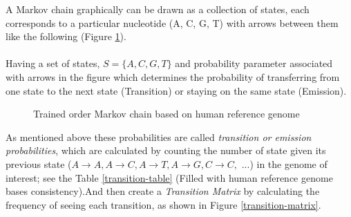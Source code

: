 \documentclass[11pt,a4paper]{report}
\begin{document}
 
A Markov chain graphically can be drawn as a collection of states, 
each corresponds to a particular nucleotide (A, C, G, T) with arrows
between them like the following (Figure \ref{MC}). 
\\\\ 
Having a set of states,  $ S= \{ A, C,  G, T \}$  and probability
parameter  associated with arrows in the figure which determines the
probability of transferring from one state to the next state (Transition)
or staying on the same state (Emission).

\begin{figure}
 \begin{center}
  \caption{Trained  order Markov chain based on human reference genome}
  \label{MC}
 \end{center}
\end{figure}





As mentioned above these probabilities are called \emph{transition or emission 
probabilities}, which are calculated by counting the number of state given its 
previous state ($ A \rightarrow A, A\rightarrow C, A \rightarrow T, A \rightarrow 
G, C \rightarrow C,$ ...) in the genome of interest; see the Table \ref{transition-table}
(Filled with human reference genome bases consistency).And then create a 
\emph{Transition Matrix} by calculating the frequency of seeing each transition,
as shown in Figure \ref{transition-matrix}.\\
\end{document}
